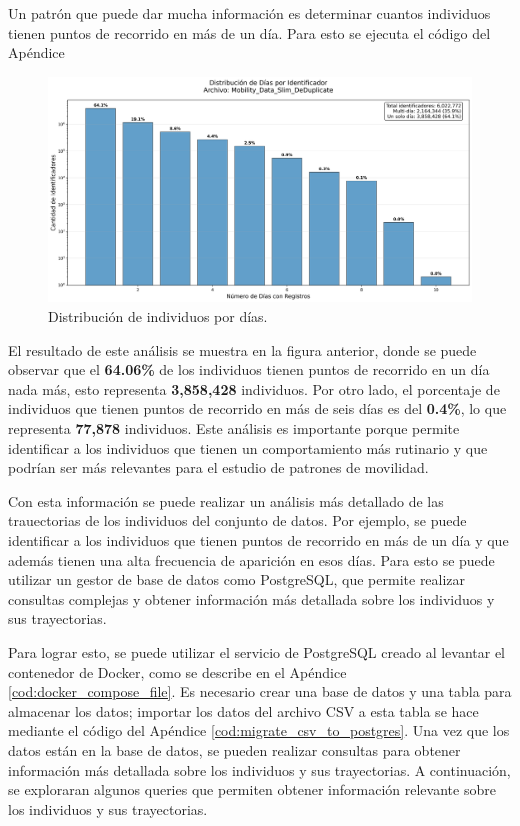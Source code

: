 Un patrón que puede dar mucha información es determinar cuantos individuos tienen puntos de recorrido en más de un día. Para esto se ejecuta el código del Apéndice 

\begin{figure}[H]
  \centering
  \includegraphics[width=\textwidth]{img/multi_day_analysis_Mobility_Data_Slim_DeDuplicate.png}
  \caption{Distribución de individuos por días.}
  \label{fig:multi_day_analysis}
\end{figure}

El resultado de este análisis se muestra en la figura anterior, donde se puede observar que el \textbf{64.06\%} de los individuos tienen puntos de recorrido en un día nada más, esto representa \textbf{3,858,428} individuos. Por otro lado, el porcentaje de individuos que tienen puntos de recorrido en más de seis días es del \textbf{0.4\%}, lo que representa \textbf{77,878} individuos. Este análisis es importante porque permite identificar a los individuos que tienen un comportamiento más rutinario y que podrían ser más relevantes para el estudio de patrones de movilidad. 

Con esta información se puede realizar un análisis más detallado de las trauectorias de los individuos del conjunto de datos. Por ejemplo, se puede identificar a los individuos que tienen puntos de recorrido en más de un día y que además tienen una alta frecuencia de aparición en esos días. Para esto se puede utilizar un gestor de base de datos como PostgreSQL, que permite realizar consultas complejas y obtener información más detallada sobre los individuos y sus trayectorias.

Para lograr esto, se puede utilizar el servicio de PostgreSQL creado al levantar el contenedor de Docker, como se describe en el Apéndice \ref{cod:docker_compose_file}. Es necesario crear una base de datos y una tabla para almacenar los datos; importar los datos del archivo CSV a esta tabla se hace mediante el código del Apéndice \ref{cod:migrate_csv_to_postgres}. Una vez que los datos están en la base de datos, se pueden realizar consultas para obtener información más detallada sobre los individuos y sus trayectorias. A continuación, se exploraran algunos queries que permiten obtener información relevante sobre los individuos y sus trayectorias.

